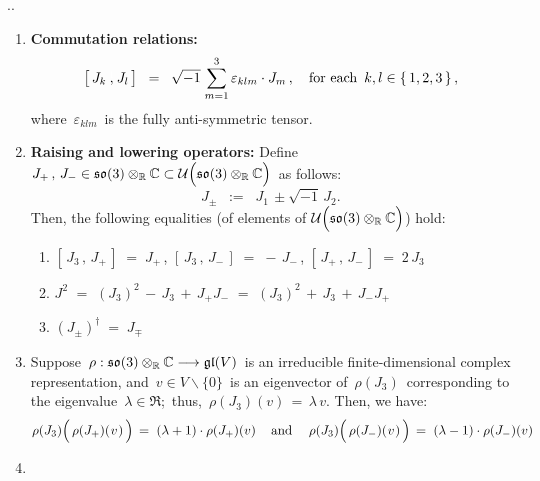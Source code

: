 \begin{proposition}
{\color{white}.}\vskip -0.5cm{\color{white}.}
\begin{enumerate}
\item
	\textbf{Commutation relations:}\;\;
	\begin{equation*}
	\left[\,J_{k}\,\overset{{\color{white}1}}{,}\,J_{l}\,\right]
	\;\; = \;\;
		\sqrt{-1}\;\overset{3}{\underset{m=1}{\sum}}\,\varepsilon_{klm}\cdot J_{m}\,,
	\quad
	\textnormal{for each \,$k, l \in \{\,1,2,3\,\}$}\,,
	\end{equation*}
	where \,$\varepsilon_{klm}$\, is the fully anti-symmetric tensor.
\item
	\textbf{Raising and lowering operators:}\;\;
	Define \,$J_{+}\,,\, J_{-} \in \mathfrak{so}(3) \otimes_{\Re} \C \subset \mathcal{U}\!\left(\mathfrak{so}(3) \overset{{\color{white}.}}{\otimes_{\Re}} \C\right)$\, as follows:
	\begin{equation*}
	J_{\pm} \;\; := \;\; J_{1} \, \pm \sqrt{-1}\,J_{2}.
	\end{equation*}
	Then, the following equalities (of elements of $\mathcal{U}\!\left(\mathfrak{so}(3) \overset{{\color{white}.}}{\otimes_{\Re}} \C\right)$) hold:
	\begin{enumerate}
	\item
		$\left[\,J_{3}\,,\,J_{+}\,\right] \;=\; J_{+}$\,,
		\quad
		$\left[\,J_{3}\,,\,J_{-}\,\right] \;=\; -\,J_{-}$\,,
		\quad
		$\left[\,J_{+}\,,\,J_{-}\,\right] \;=\; 2\,J_{3}$
	\item
		$J^{2}$
		\; $=$ \; $(J_{3})^{2} \,-\, J_{3} \,+\, J_{+}J_{-}$
		\; $=$ \; $(J_{3})^{2} \,+\, J_{3} \,+\, J_{-}J_{+}$
	\item
		$(J_{\pm})^{\dagger} \; = \; J_{\mp}$
	\end{enumerate}
\item
	Suppose
	\,$\rho : \mathfrak{so}(3) \otimes_{\mathbb{R}} \mathbb{C} \longrightarrow \mathfrak{gl}(V)$\,
	is an irreducible finite-dimensional complex representation, and
	\,$v \in V \backslash\{0\}$\, is an eigenvector of \,$\rho(J_{3})$\,
	corresponding to the eigenvalue \,$\lambda \in \Re$;\, thus, \,$\rho(J_{3})(v) \,=\, \lambda\,v$.
	Then, we have:
	\begin{equation*}
	\rho(J_{3})\!\left(\,\rho(J_{+})(\overset{{\color{white}-}}{v})\,\right) \, = \; (\lambda+1)\cdot\rho(J_{+})(v)\,
	\quad\textnormal{and}\quad\;
	\rho(J_{3})\!\left(\,\rho(J_{-})(\overset{{\color{white}-}}{v})\,\right) \, = \; (\lambda-1)\cdot\rho(J_{-})(v)
	\end{equation*}
\item

\end{enumerate}
\end{proposition}
